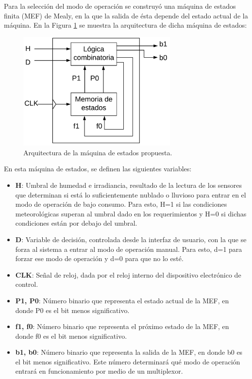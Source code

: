 Para la selección del modo de operación se construyó una máquina de estados finita (MEF) de Mealy, en la que la salida de ésta depende del estado actual de la máquina. En la Figura \ref{fig:mef_arq} se muestra la arquitectura de dicha máquina de estados:
\begin{figure}[H]
	\centering
	\includegraphics[width=8cm]{imagenes/MEF_Miley(arquitectura)}
	\caption{Arquitectura de la máquina de estados propuesta.}
	\label{fig:mef_arq}
\end{figure}

En esta máquina de estados, se definen las siguientes variables:

\begin{itemize}
	\item \textbf{H}: Umbral de humedad e irradiancia, resultado de la lectura de los sensores que determinan si está lo suficientemente nublado o lluvioso para entrar en el modo de operación de bajo consumo. Para esto, H=1 si las condiciones meteorológicas superan al umbral dado en los requerimientos y H=0 si dichas condiciones están por debajo del umbral.
	\item \textbf{D}: Variable de decisión, controlada desde la interfaz de usuario, con la que se forza al sistema a entrar al modo de operación manual. Para esto, d=1 para forzar ese modo de operación y d=0 para que no lo esté.
	\item \textbf{CLK}: Señal de reloj, dada por el reloj interno del dispositivo electrónico de control.
	\item \textbf{P1, P0}: Número binario que representa el estado actual de la MEF, en donde P0 es el bit menos significativo.
	\item \textbf{f1, f0}: Número binario que representa el próximo estado de la MEF, en donde f0 es el bit menos significativo.
	\item \textbf{b1, b0}: Número binario que representa la salida de la MEF, en donde b0 es el bit menos significativo. Este número determinará qué modo de operación entrará en funcionamiento por medio de un multiplexor.
\end{itemize}

